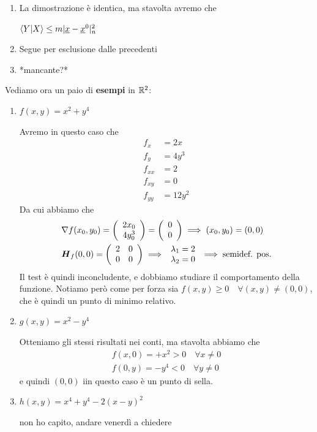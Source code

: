 \begin{enumerate}
\begin{enumerate}
		\item La dimostrazione è identica, ma stavolta avremo che 
		
		$\braket{Y|X}\leq m |\underline{x} - \underline{x}^0|_n^2$
		
		\item Segue per esclusione dalle precedenti
		
		\item *mancante?*
	\end{enumerate}
	
\end{enumerate}

\newpage

Vediamo ora un paio di \textbf{esempi} in $\mathbb{R}^2$:
\begin{enumerate}
	\item $f(x,y)= x^2 + y^4$
	
	Avremo in questo caso che
	\begin{align}
		f_x {}&= 2x\\
		f_y&= 4y^3\\
		f_{xx}&= 2\\
		f_{xy}&= 0\\
		f_{yy}&= 12y^2
	\end{align}
	Da cui abbiamo che
	\begin{align}
		{}&\nabla f(x_0,y_0)=\left( \begin{array}{cc} 2x_0 \\ 4y_0^3 \end{array} \right)=\left( \begin{array}{cc} 0 \\ 0 \end{array} \right) \implies (x_0,y_0)=(0,0)\\
		&\boldsymbol{H}_{f} (0,0)=\left( \begin{array}{ccc} 2 & 0 \\ 0 & 0 \end{array} \right) \implies \begin{array}{cc}
			\lambda_1 = 2\\
			\lambda_2 = 0
		\end{array}\implies \text{semidef. pos.}
	\end{align}
	Il test è quindi inconcludente, e dobbiamo studiare il comportamento della funzione. Notiamo però come per forza sia $f(x,y)\geq 0 \quad \forall (x,y)\neq (0,0)$, che è quindi un punto di minimo relativo.
	
	\item $g(x,y)= x^2 - y^4$
	
	Otteniamo gli stessi risultati nei conti, ma stavolta abbiamo che
	\begin{align}
		f(x,0)=+x^2> 0 \quad \forall x\neq 0\\
		f(0,y)=-y^4<0 \quad \forall y \neq 0
	\end{align}
	e quindi $(0,0)$ iin questo caso è un punto di sella.
	
	\item $h(x,y)=x^4 + y^4 - 2(x-y)^2$
	
	non ho capito, andare venerdì a chiedere
\end{enumerate}	 

